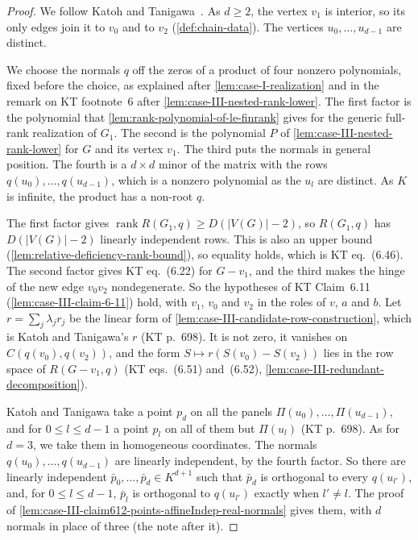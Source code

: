 \begin{proof}
  \leanok
  We follow Katoh and Tanigawa~\cite[pp.~692--698]{katohTanigawa2011}.
  As $d \ge 2$, the vertex $v_1$ is interior, so its only edges join it
  to $v_0$ and to $v_2$ (\cref{def:chain-data}). The vertices
  $u_0, \dots, u_{d-1}$ are distinct.

  We choose the normals $q$ off the zeros of a product of four nonzero
  polynomials, fixed before the choice, as explained after
  \cref{lem:case-I-realization} and in the remark on KT footnote~6 after
  \cref{lem:case-III-nested-rank-lower}. The first factor is the
  polynomial that \cref{lem:rank-polynomial-of-le-finrank} gives for the
  generic full-rank realization of $G_1$. The second is the polynomial
  $P$ of \cref{lem:case-III-nested-rank-lower} for $G$ and its vertex
  $v_1$. The third puts the normals in general position. The fourth is
  a $d \times d$ minor of the matrix with the rows
  $q(u_0), \dots, q(u_{d-1})$, which is a nonzero polynomial as the
  $u_l$ are distinct. As $K$ is infinite, the product has a non-root $q$.

  The first factor gives
  $\operatorname{rank} R(G_1, q) \ge D(|V(G)| - 2)$, so $R(G_1, q)$ has
  $D(|V(G)| - 2)$ linearly independent rows. This is also an upper bound
  (\cref{lem:relative-deficiency-rank-bound}), so equality holds, which
  is KT eq.~(6.46). The second factor gives KT eq.~(6.22)
  for $G - v_1$, and the third makes the hinge of the new edge
  $v_0 v_2$ nondegenerate. So the hypotheses of KT Claim~6.11
  (\cref{lem:case-III-claim-6-11}) hold, with $v_1$, $v_0$ and $v_2$ in
  the roles of $v$, $a$ and $b$. Let $r = \sum_j \lambda_j r_j$ be the
  linear form of \cref{lem:case-III-candidate-row-construction}, which
  is Katoh and Tanigawa's $r$ (KT p.~698). It is not zero, it vanishes
  on $C(q(v_0), q(v_2))$, and the form $S \mapsto r(S(v_0) - S(v_2))$
  lies in the row space of $R(G - v_1, q)$ (KT eqs.~(6.51)
  and~(6.52), \cref{lem:case-III-redundant-decomposition}).

  Katoh and Tanigawa take a point $p_d$ on all the panels
  $\Pi(u_0), \dots, \Pi(u_{d-1})$, and for $0 \le l \le d - 1$ a point
  $p_l$ on all of them but $\Pi(u_l)$ (KT p.~698). As for $d = 3$, we
  take them in homogeneous coordinates. The normals
  $q(u_0), \dots, q(u_{d-1})$ are linearly independent, by the fourth
  factor. So there are linearly independent
  $\bar p_0, \dots, \bar p_d \in K^{d+1}$ such that $\bar p_d$ is
  orthogonal to every $q(u_{l'})$, and, for $0 \le l \le d - 1$,
  $\bar p_l$ is orthogonal to $q(u_{l'})$ exactly when $l' \neq l$. The
  proof of \cref{lem:case-III-claim612-points-affineIndep-real-normals}
  gives them, with $d$ normals in place of three (the note after it).


\end{proof}
